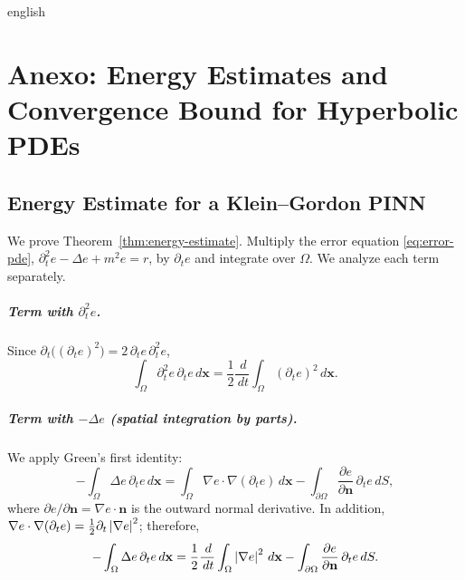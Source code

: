 \documentclass[../0000.tex]{subfiles}
\begin{document}

\begin{hyphenrules}{english}

\chapter{Anexo: Energy Estimates and Convergence Bound for Hyperbolic PDEs}\label{app:derivations}

\section{Energy Estimate for a Klein--Gordon PINN}\label{app:energy}

We prove Theorem~\ref{thm:energy-estimate}. Multiply the error equation \eqref{eq:error-pde},
$\partial_t^2e-\Delta e+m^2e=r$, by $\partial_te$ and integrate over $\Omega$. We analyze each term
separately.

\paragraph{Term with $\partial_t^2e$.}
Since $\partial_t\big((\partial_te)^2\big)=2\,\partial_te\,\partial_t^2e$,
\[
  \int_\Omega\partial_t^2e\,\partial_te\,d\mathbf{x}=\frac12\frac{\,d}{\,d t}\int_\Omega(\partial_te)^2\,d\mathbf{x}.
\]

\paragraph{Term with $-\Delta e$ (spatial integration by parts).}
We apply Green's first identity:
\[
  -\int_\Omega\Delta e\,\partial_te\,d\mathbf{x}=\int_\Omega\nabla e\cdot\nabla(\partial_te)\,d\mathbf{x}
  -\int_{\partial\Omega}\frac{\partial e}{\partial\mathbf{n}}\,\partial_te\,d S,
\]
where $\partial e/\partial\mathbf{n}=\nabla e\cdot\mathbf{n}$ is the outward normal derivative. In addition,
$\nabla e\cdot\nabla(\partial_te)=\frac12\partial_t\left\lvert \nabla e \right\rvert^2$; therefore,
\begin{equation}
  -\int_\Omega\Delta e\,\partial_te\,d\mathbf{x}=\frac12\frac{\,d}{\,d t}\int_\Omega\left\lvert \nabla e \right\rvert^2\,d\mathbf{x}
  -\int_{\partial\Omega}\frac{\partial e}{\partial\mathbf{n}}\,\partial_te\,d S.
  \label{eq:app-lap}
\end{equation}


\end{hyphenrules}
\end{document}
